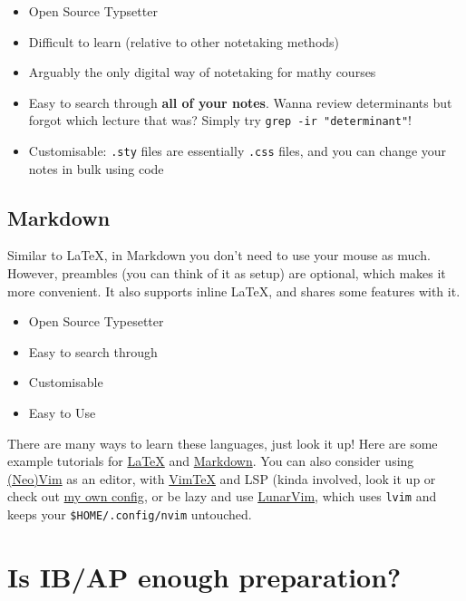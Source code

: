 \begin{itemize}
    \item Open Source Typsetter
    \item Difficult to learn (relative to other notetaking methods)
    \item Arguably the only digital way of notetaking for mathy courses
    \item Easy to search through \textbf{all of your notes}. Wanna review determinants but forgot which lecture that was? Simply try \verb|grep -ir "determinant"|!
    \item Customisable: \verb|.sty| files are essentially \verb|.css| files, and you can change your notes in bulk using code
\end{itemize}

\subsection{Markdown}

Similar to \LaTeX, in Markdown you don't need to use your mouse as much. However, preambles (you can think of it as setup) are optional, which makes it more convenient. It also supports inline \LaTeX, and shares some features with it.

\begin{itemize}
    \item Open Source Typesetter
    \item Easy to search through
    \item Customisable
    \item Easy to Use
\end{itemize}

There are many ways to learn these languages, just look it up! Here are some example tutorials for \href{https://www.overleaf.com/learn/latex/Learn_LaTeX_in_30_minutes}{\LaTeX} and \href{https://www.markdowntutorial.com/}{Markdown}. You can also consider using \href{https://neovim.io/}{(Neo)Vim} as an editor, with \href{https://github.com/lervag/vimtex}{VimTeX} and LSP (kinda involved, look it up or check out \href{https://github.com/latexsupremecist/Misc/blob/main/configurations/init.vim}{my own config}, or be lazy and use \href{https://www.lunarvim.org/}{LunarVim}, which uses \verb|lvim| and keeps your \verb|$HOME/.config/nvim| untouched.

\section{Is IB/AP enough preparation?}

